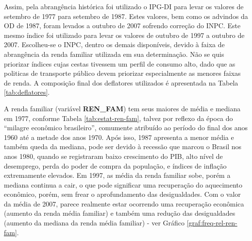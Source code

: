 Assim, pela abrangência histórica foi utilizado o IPG-DI para levar os valores de setembro de 1977 para setembro de 1987. Estes valores, bem como os advindos da OD de 1987, foram levados a outubro de 2007 sofrendo correção do INPC. Este mesmo índice foi utilizado para levar os valores de outubro de 1997 a outubro de 2007. Escolheu-se o INPC, dentro os demais disponíveis, devido à faixa de abrangência da renda familiar utilizada em sua determinação. Não se quis priorizar índices cujas cestas tivessem um perfil de consumo alto, dado que as politicas de transporte público devem priorizar especialmente as menores faixas de renda. A composição final dos deflatores utilizados é apresentada na Tabela \ref{tab:deflatores}.

\begin{table}[htb]

\end{table}


A renda familiar (variável \textbf{REN_FAM}) tem seus maiores de média e mediana em 1977, conforme Tabela \ref{tab:estat-ren-fam}, talvez por reflexo da época do ``milagre econômico brasileiro'', %
comumente atribuído ao período do final dos anos 1960 até a metade dos anos 1970.
Após isso, 1987 apresenta a menor média e também queda da mediana, pode ser devido à recessão que marcou o Brasil nos anos 1980, quando se registraram baixo crescimento do PIB, %
alto nível de desemprego, %
perda do poder de compra da população, %
e índices de inflação extremamente elevados. %
Em 1997, as média da renda familiar sobe, porém a mediana continua a cair, o que pode significar uma recuperação do aquecimento econômico, porém, sem frear o aprofundamento das desigualdades. %
Com o valor da média de 2007, parece realmente estar ocorrendo uma recuperação econômica (aumento da renda média familiar) e também uma redução das desigualdades (aumento da mediana da renda média familiar) - ver Gráfico \ref{graf:freq-rel-ren-fam}.


